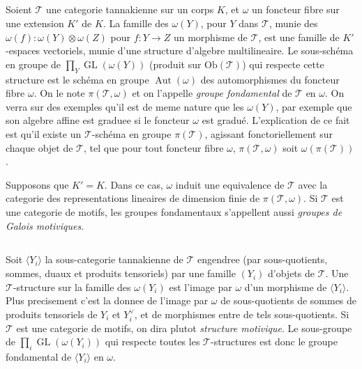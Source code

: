 \documentclass[11pt,a4paper]{article}
\theoremstyle{plain}
\theoremstyle{definition}
\DeclareMathOperator{\Aut}{Aut}
\DeclareMathOperator{\GL}{GL}
\begin{document}
\subsection{}\label{ssec:5.5}

Soient $\mathcal{T}$ une categorie tannakienne sur un corps $K$, et $\omega$ un foncteur fibre sur une extension $K'$ de $K$. La famille des $\omega(Y)$, pour $Y$ dans $\mathcal{T}$, munie des $\omega(f): \omega(Y) \otimes \omega(Z)$ pour $f: Y \to Z$ un morphisme de $\mathcal{T}$, est une famille de $K'$-espaces vectoriels, munie d'une structure d'algebre multilineaire. Le sous-sch\'ema en groupe de $\prod_{Y} \GL(\omega(Y))$ (produit sur $\mathrm{Ob}(\mathcal{T})$) qui respecte cette structure est le sch\'ema en groupe $\Aut(\omega)$ des automorphismes du foncteur fibre $\omega$. On le note $\pi(\mathcal{T},\omega)$ et on l'appelle \emph{groupe fondamental} de $\mathcal{T}$ en $\omega$. On verra sur des exemples qu'il est de meme nature que les $\omega(Y)$, par exemple que son algebre affine est graduee si le foncteur $\omega$ est gradu\'e. L'explication de ce fait est qu'il existe un $\mathcal{T}$-sch\'ema en groupe $\pi(\mathcal{T})$, agissant fonctoriellement sur chaque objet de $\mathcal{T}$, tel que pour tout foncteur fibre $\omega$, $\pi(\mathcal{T},\omega)$ soit $\omega(\pi(\mathcal{T}))$.

Supposons que $K' = K$. Dans ce cas, $\omega$ induit une equivalence de $\mathcal{T}$ avec la categorie des representations lineaires de dimension finie de $\pi(\mathcal{T},\omega)$. Si $\mathcal{T}$ est une categorie de motifs, les groupes fondamentaux s'appellent aussi \emph{groupes de Galois motiviques}.

\subsection{}\label{ssec:5.6}

Soit $\langle Y_i \rangle$ la sous-categorie tannakienne de $\mathcal{T}$ engendree (par sous-quotients, sommes, duaux et produits tensoriels) par une famille $(Y_i)$ d'objets de $\mathcal{T}$. Une $\mathcal{T}$-structure sur la famille des $\omega(Y_i)$ est l'image par $\omega$ d'un morphisme de $\langle Y_i \rangle$. Plus precisement c'est la donnee de l'image par $\omega$ de sous-quotients de sommes de produits tensoriels de $Y_i$ et $Y_i^{\vee}$, et de morphismes entre de tels sous-quotients. Si $\mathcal{T}$ est une categorie de motifs, on dira plutot \emph{structure motivique}. Le sous-groupe de $\prod_i \GL(\omega(Y_i))$ qui respecte toutes les $\mathcal{T}$-structures est donc le groupe fondamental de $\langle Y_i \rangle$ en $\omega$.
\end{document}
